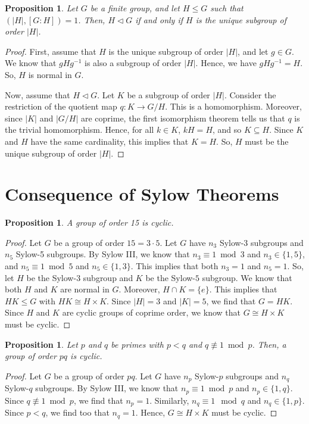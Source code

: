 \documentclass[a4paper, openany]{memoir}
\theoremstyle{definition}
\theoremstyle{plain}
\newtheorem{proposition}[definition]{Proposition}
\begin{document}
    \begin{proposition}
        Let $G$ be a finite group, and let $H \leq G$ such that $(|H|, [G:H]) = 1$. Then, $H \vartriangleleft G$ if and only if $H$ is the unique subgroup of order $|H|$.
    \end{proposition}
    \begin{proof}
        First, assume that $H$ is the unique subgroup of order $|H|$, and let $g \in G$. We know that $gHg^{-1}$ is also a subgroup of order $|H|$. Hence, we have $gHg^{-1} = H$. So, $H$ is normal in $G$.

        Now, assume that $H \vartriangleleft G$. Let $K$ be a subgroup of order $|H|$. Consider the restriction of the quotient map $q: K \to G/H$. This is a homomorphism. Moreover, since $|K|$ and $|G/H|$ are coprime, the first isomorphism theorem tells us that $q$ is the trivial homomorphism. Hence, for all $k \in K$, $kH = H$, and so $K \subseteq H$. Since $K$ and $H$ have the same cardinality, this implies that $K = H$. So, $H$ must be the unique subgroup of order $|H|$.
    \end{proof}

    \newpage

    \section{Consequence of Sylow Theorems}
    \begin{proposition}
        A group of order 15 is cyclic.
    \end{proposition}
    \begin{proof}
        Let $G$ be a group of order $15 = 3 \cdot 5$. Let $G$ have $n_3$ Sylow-3 subgroups and $n_5$ Sylow-5 subgroups. By Sylow III, we know that $n_3 \equiv 1 \bmod{3}$ and $n_3 \in \{1, 5\}$, and $n_5 \equiv 1 \bmod{5}$ and $n_5 \in \{1, 3\}$. This implies that both $n_3 = 1$ and $n_5 = 1$. So, let $H$ be the Sylow-$3$ subgroup and $K$ be the Sylow-$5$ subgroup. We know that both $H$ and $K$ are normal in $G$. Moreover, $H \cap K = \{e\}$. This implies that $HK \leq G$ with $HK \cong H \times K$. Since $|H| = 3$ and $|K| = 5$, we find that $G = HK$. Since $H$ and $K$ are cyclic groups of coprime order, we know that $G \cong H \times K$ must be cyclic.
    \end{proof}

    \begin{proposition}
        Let $p$ and $q$ be primes with $p < q$ and $q \not\equiv 1 \bmod{p}$. Then, a group of order $pq$ is cyclic.
    \end{proposition}
    \begin{proof}
        Let $G$ be a group of order $pq$. Let $G$ have $n_p$ Sylow-$p$ subgroups and $n_q$ Sylow-$q$ subgroups. By Sylow III, we know that $n_p \equiv 1 \bmod{p}$ and $n_p \in \{1, q\}$. Since $q \not\equiv 1 \bmod{p}$, we find that $n_p = 1$. Similarly, $n_q \equiv 1 \mod{q}$ and $n_q \in \{1, p\}$. Since $p < q$, we find too that $n_q = 1$. Hence, $G \cong H \times K$ must be cyclic.
    \end{proof}
    
\end{document}
